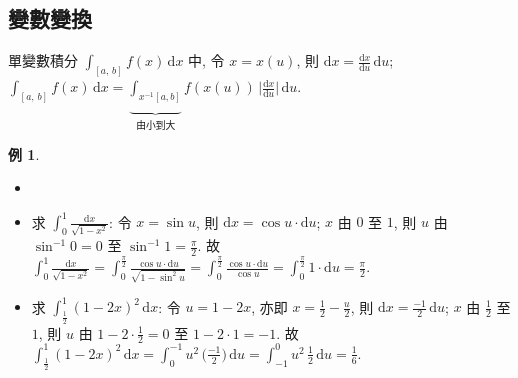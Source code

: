 \documentclass[12pt]{extarticle}
\newcommand{\ds}{\displaystyle}
\theoremstyle{definition}
\newtheorem*{ex}{例}
\newtheorem*{sol}{解}
\begin{document}
%

\subsection*{變數變換}
單變數積分 $\ds\int_{[a,\,b]}\!f(x)\,\text{d}x$ 中, 令 $\ds x = x(u)$, 則 $\ds\text{d}x = \frac{\text{d}x}{\text{d}u}\,\text{d}u$; $\ds\int_{[a,\,b]}\!f(x)\,\text{d}x = \underbrace{\int_{x^{-1}[a, b]}}_{\text{由小到大}}\!f(x(u))\,\bigg|\frac{\text{d}x}{\text{d}u}\bigg|\,\text{d}u$. 
\begin{ex}
  \begin{itemize}\setlength{\itemsep}{0pt}
    \item[]
    \item 求 $\ds\int_0^{1}\!\frac{\text{d}x}{\sqrt{1 - x^2}}$: 令 $\ds x = \sin u$, 則 $\ds\text{d}x = \cos u\cdot\text{d}u$; $x$ 由 $\ds 0$ 至 $\ds 1$, 則 $u$ 由 $\ds\sin^{-1}0 = 0$ 至 $\ds\sin^{-1}1 = \frac{\pi}{2}$. 故 $\ds\int_0^{1}\!\frac{\text{d}x}{\sqrt{1 - x^2}} = \int_0^{\frac{\pi}{2}}\!\frac{\cos u\cdot\text{d}u}{\sqrt{1 - \sin^2 u}} = \int_0^{\frac{\pi}{2}}\!\frac{\cos u\cdot\text{d}u}{\cos u} = \int_0^{\frac{\pi}{2}}\!1\cdot\text{d}u = \frac{\pi}{2}$.
    \item 求 $\ds\int_{\frac{1}{2}}^1\!(1 - 2x)^2\,\text{d}x$: 令 $\ds u = 1 - 2x$, 亦即 $\ds x = \frac{1}{2} - \frac{u}{2}$, 則 $\ds\text{d}x = \frac{-1}{2}\,\text{d}u$; $x$ 由 $\ds\frac{1}{2}$ 至 $1$, 則 $u$ 由 $\ds 1 - 2\cdot\frac{1}{2} = 0$ 至 $1 - 2\cdot 1 = -1$. 故 $\ds\int_{\frac{1}{2}}^1\!(1 - 2x)^2\,\text{d}x = \int_0^{-1}\!u^2\,\Big(\frac{-1}{2}\Big)\,\text{d}u = \int_{-1}^0\!u^2\,\frac{1}{2}\,\text{d}u = \frac{1}{6}$. 
  \end{itemize}
\end{ex}
\end{document}
